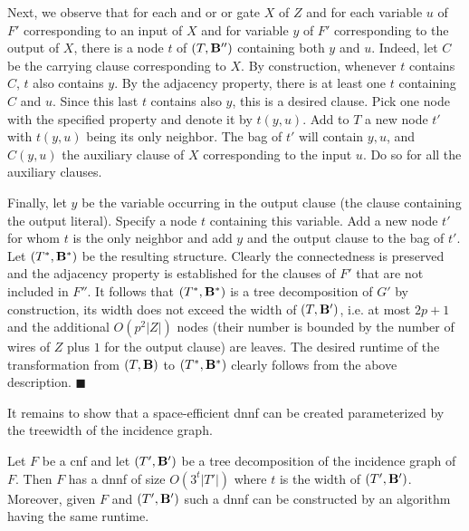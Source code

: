 \documentclass{llncs}
\begin{document}
Next, we observe that for each {\sc and} or {\sc or} gate $X$ of $Z$ and for each variable $u$ of $F'$ corresponding to an input
of $X$ and for variable $y$ of $F'$ corresponding to the output of $X$, there is a node $t$ of $(T,{\bf B''})$
containing both $y$ and $u$. Indeed, let $C$ be the carrying clause corresponding to $X$. By construction, whenever
$t$ contains $C$, $t$ also contains $y$. By the adjacency property, there is at least one $t$ containing $C$ and $u$.
Since this last $t$ contains also $y$, this is a desired clause. Pick one node with the specified property and denote
it by $t(y,u)$. Add to $T$ a new node $t'$ with $t(y,u)$ being its only neighbor. The bag of $t'$ will contain
$y,u$, and $C(y,u)$ the auxiliary clause of $X$ corresponding to the input $u$. Do so for all the auxiliary clauses. 
\begin{comment}
Finally, properly add a node whose bag contains the variable $y$ of the output literal and the singleton clause containing
this literal (the neighbor of this new node should be an existing node containing $y$). 
Let $(T^*,{\bf B^*})$ be the resulting structure. It is not hard to observe by construction that 
$(T^*,{\bf B^*})$ satisfies the statement of the lemma.
\end{comment}
Finally, let $y$ be the variable occurring in the output clause (the clause containing the 
output literal). Specify a node $t$ containing this variable.
Add a new node $t'$ for whom $t$ is the only neighbor and add $y$ and the output clause to the bag of $t'$. 
Let $(T^*,{\bf B^*})$ be the resulting structure. Clearly the connectedness is preserved and the adjacency property
is established for the clauses of $F'$ that are not included in $F''$. It follows that $(T^*,{\bf B^*})$ is a tree
decomposition of $G'$ by construction, its width does not exceed the width of $(T,{\bf B'})$, i.e. at most
$2p+1$ and the additional $O(p^2|Z|)$ nodes (their number is bounded by the number of wires of $Z$ plus $1$ for
the output clause) are leaves. The desired runtime of the transformation from $(T,{\bf B})$ to
$(T^*,{\bf B^*})$ clearly follows from the above description. 
$\blacksquare$

It remains to show that a space-efficient {\sc dnnf} can be created parameterized by the treewidth of the incidence
graph. 

\begin{theorem} \label{dnnfcnf}
Let $F$ be a {\sc cnf} and let $(T',{\bf B'})$ be a tree decomposition of the incidence graph of $F$.
Then $F$ has a {\sc dnnf} of size $O(3^t|T'|)$ where $t$ is the width of $(T',{\bf B'})$.
Moreover, given $F$ and $(T',{\bf B'})$ such a {\sc dnnf} can be constructed by an algorithm having the same runtime. 
\end{theorem}
\end{document}
